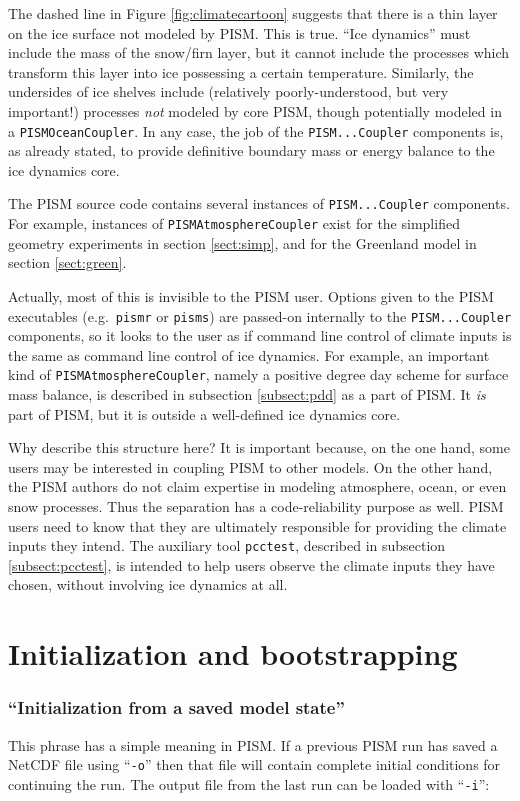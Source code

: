 \documentclass[11pt,final]{amsart}
\renewcommand{\t}[1]{\texttt{#1}}
\newcommand{\pismoptionindex}[1]{\index{options for PISM (and PETSc)!\texttt{-#1}}}
\newcommand{\intextoption}[1]{\texttt{-#1}\pismoptionindex{#1}}
\begin{document}
The dashed line in Figure \ref{fig:climatecartoon} suggests that there is a thin layer on the ice surface not modeled by PISM.  This is true.  ``Ice dynamics'' must include the mass of the snow/firn layer, but it cannot include the processes which transform this layer into ice possessing a certain temperature.  Similarly, the undersides of ice shelves include (relatively poorly-understood, but very important!) processes \emph{not} modeled by core PISM, though potentially modeled in a \t{PISMOceanCoupler}.  In any case, the job of the \t{PISM...Coupler} components is, as already stated, to provide definitive boundary mass or energy balance to the ice dynamics core.

The PISM source code contains several instances of \t{PISM...Coupler} components.  For example, instances of \t{PISMAtmosphereCoupler} exist for the simplified geometry experiments in section \ref{sect:simp}, and for the Greenland model in section \ref{sect:green}.

Actually, most of this is invisible to the PISM user.  Options given to the PISM executables (e.g.~\t{pismr} or \t{pisms}) are passed-on internally to the \t{PISM...Coupler} components, so it looks to the user as if command line control of climate inputs is the same as command line control of ice dynamics.  For example, an important kind of \t{PISMAtmosphereCoupler}, namely a positive degree day scheme for surface mass balance, is described in subsection \ref{subsect:pdd} as a part of PISM.  It \emph{is} part of PISM, but it is outside a well-defined ice dynamics core.

Why describe this structure here?  It is important because, on the one hand, some users may be interested in coupling PISM to other models.  On the other hand, the PISM authors do not claim expertise in modeling atmosphere, ocean, or even snow processes.  Thus the separation has a code-reliability purpose as well.  PISM users need to know that they are ultimately responsible for providing the climate inputs they intend.  The auxiliary tool \verb|pcctest|, described in subsection \ref{subsect:pcctest}, is intended to help users observe the climate inputs they have chosen, without involving ice dynamics at all.


\clearpage
\newpage
\section{Initialization and bootstrapping}\label{sect:boot}  

\subsubsection*{``Initialization from a saved model state''}  This phrase has a simple meaning in PISM.  If a previous PISM run has saved a NetCDF file using ``\verb|-o|'' then that file will contain complete initial conditions for continuing the run.  The output file from the last run can be loaded with ``\intextoption{i}'':
\end{document}
